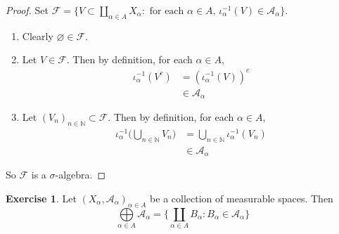 \documentclass{book}
\theoremstyle{definition}
\newtheorem{ex}[definition]{Exercise}
\newcommand{\al}{\alpha}
\newcommand{\sig}{\sigma}
\newcommand{\N}{\mathbb{N}}
\newcommand{\MA}{\mathcal{A}}
\newcommand{\MF}{\mathcal{F}}
\DeclareMathOperator*{\0}{\mbf{0}}
\DeclareMathOperator*{\1}{\mbf{1}}
\begin{document}
	\begin{proof}
		Set $\MF = \{V \subset \coprod_{\al \in A}  X_{\al}: \text{ for each $\al \in A$, $\iota_{\al}^{-1}(V) \in \MA_{\al}$}\}$.
		\begin{enumerate}
			\item Clearly $\varnothing \in \MF$.
			\item Let $V \in \MF$. Then by definition, for each $\al \in A$,
			\begin{align*}
				\iota_{\al}^{-1}(V^c)
				& = ( \iota_{\al}^{-1}(V))^c \\
				& \in \MA_{\al}
			\end{align*}
			\item Let $(V_n)_{n \in \N} \subset \MF$. Then by definition, for each $\al \in A$,
			\begin{align*}
				\iota_{\al}^{-1}\bigg( \bigcup_{n \in \N} V_n \bigg)
				& = \bigcup_{n \in \N} \iota_{\al}^{-1}(V_n)\\
				& \in \MA_{\al}
			\end{align*}
		\end{enumerate}
		So $\MF$ is a $\sig$-algebra.
	\end{proof}

	\begin{ex}
		Let $(X_{\al}, \MA_{\al})_{\al \in A}$ be a collection of measurable spaces. Then 
		$$\bigoplus\limits_{\al \in A} \MA_{\al} = \bigg \{\coprod_{\al \in A} B_{\al}: B_{\al} \in \MA_{\al} \bigg\} $$
	\end{ex}
\end{document}
